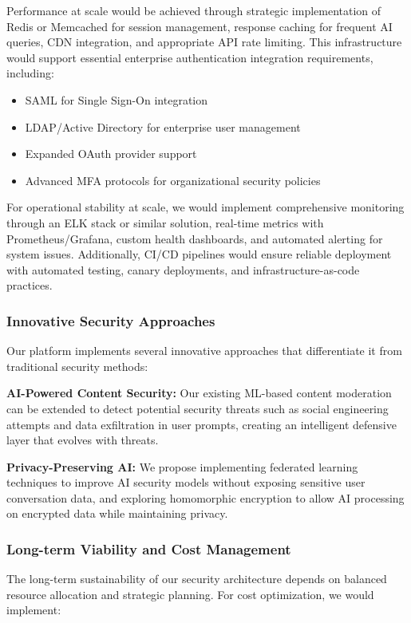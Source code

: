 \documentclass{article}
\begin{document}
Performance at scale would be achieved through strategic implementation of Redis or Memcached for session management, response caching for frequent AI queries, CDN integration, and appropriate API rate limiting. This infrastructure would support essential enterprise authentication integration requirements, including:

\begin{itemize}
    \item SAML for Single Sign-On integration
    \item LDAP/Active Directory for enterprise user management
    \item Expanded OAuth provider support
    \item Advanced MFA protocols for organizational security policies
\end{itemize}

For operational stability at scale, we would implement comprehensive monitoring through an ELK stack or similar solution, real-time metrics with Prometheus/Grafana, custom health dashboards, and automated alerting for system issues. Additionally, CI/CD pipelines would ensure reliable deployment with automated testing, canary deployments, and infrastructure-as-code practices.

\subsubsection{Innovative Security Approaches}
Our platform implements several innovative approaches that differentiate it from traditional security methods:

\textbf{AI-Powered Content Security:} Our existing ML-based content moderation can be extended to detect potential security threats such as social engineering attempts and data exfiltration in user prompts, creating an intelligent defensive layer that evolves with threats.

\textbf{Privacy-Preserving AI:} We propose implementing federated learning techniques to improve AI security models without exposing sensitive user conversation data, and exploring homomorphic encryption to allow AI processing on encrypted data while maintaining privacy.

\subsubsection{Long-term Viability and Cost Management}
The long-term sustainability of our security architecture depends on balanced resource allocation and strategic planning. For cost optimization, we would implement:
\end{document}
